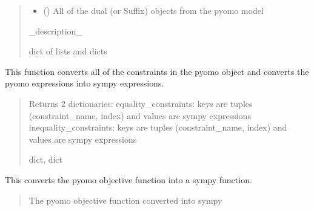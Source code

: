 \documentclass[letterpaper,10pt,english]{sphinxmanual}
\begin{document}
\begin{fulllineitems}
\begin{fulllineitems}
\begin{quote}
\begin{description}
\begin{itemize}
\item {} 
\sphinxAtStartPar
{} () \textendash{} All of the dual (or Suffix) objects from the pyomo model

\end{itemize}

\sphinxAtStartPar
\_description\_

\sphinxAtStartPar
dict of lists and dicts

\end{description}\end{quote}

\end{fulllineitems}


\begin{fulllineitems}
\label{\detokenize{src.sensitivity.faster_sensitivity:src.sensitivity.faster_sensitivity.AutoSympy.get_constraints}}
\pysigstartsignatures
\pysiglinewithargsret
{}
{}
{}
\pysigstopsignatures
\sphinxAtStartPar
This function converts all of the constraints in the pyomo object and converts the pyomo expressions into sympy expressions.
\begin{quote}\begin{description}
\sphinxAtStartPar
Returns 2 dictionaries:
equality\_constraints: keys are tuples (constraint\_name, index) and values are sympy expressions
inequality\_constraints: keys are tuples (constraint\_name, index) and values are sympy expressions

\sphinxAtStartPar
dict, dict

\end{description}\end{quote}

\end{fulllineitems}


\begin{fulllineitems}
\label{\detokenize{src.sensitivity.faster_sensitivity:src.sensitivity.faster_sensitivity.AutoSympy.get_objective}}
\pysigstartsignatures
\pysiglinewithargsret
{}
{}
{}
\pysigstopsignatures
\sphinxAtStartPar
This converts the pyomo objective function into a sympy function.
\begin{quote}\begin{description}
\sphinxAtStartPar
The pyomo objective function converted into sympy


\end{description}
\end{quote}
\end{fulllineitems}
\end{fulllineitems}
\end{document}
